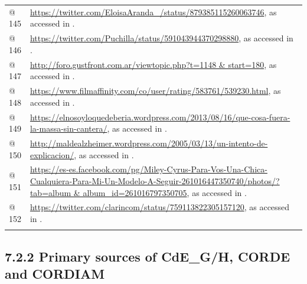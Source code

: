 \begin{tabularx}{\textwidth}{XX}
@ 145 & \url{https://twitter.com/EloisaAranda_/status/879385115260063746}, as accessed in \citealt{November2020}.\\
@ 146 & \url{https://twitter.com/Puchilla/status/591043944370298880}, as accessed in \citealt{November2020}.\\
@ 147 & \url{http://foro.gustfront.com.ar/viewtopic.php?t=1148 & start=180}, as accessed in \citealt{November2020}.\\
@ 148 & \url{https://www.filmaffinity.com/co/user/rating/583761/539230.html}, as accessed in \citealt{November2020}.\\
@ 149 & \url{https://elnosoyloquedeberia.wordpress.com/2013/08/16/que-cosa-fuera-la-massa-sin-cantera/}, as accessed in \citealt{November2020}.\\
@ 150 & \url{http://maldealzheimer.wordpress.com/2005/03/13/un-intento-de-explicacion/}, as accessed in \citealt{November2020}.\\
@ 151 & \url{https://es-es.facebook.com/pg/Miley-Cyrus-Para-Vos-Una-Chica-Cualquiera-Para-Mi-Un-Modelo-A-Seguir-261016447350740/photos/?tab=album & album_id=261016797350705}, as accessed in \citealt{June2021}.\\
@ 152 & \url{https://twitter.com/clarincom/status/759113822305157120}, as accessed in \citealt{June2021}.\\
\lspbottomrule
\end{tabularx}
\subsection{7.2.2 Primary sources of CdE\_G/H, CORDE and CORDIAM}


